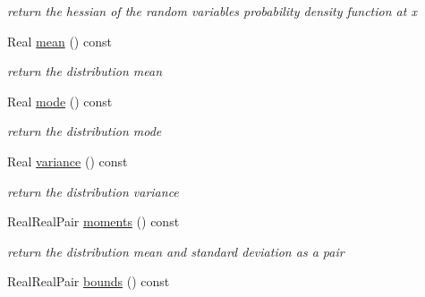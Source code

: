 \begin{DoxyCompactItemize}
\begin{DoxyCompactList}\small\item\em return the hessian of the random variable\textquotesingle{}s probability density function at x \end{DoxyCompactList}\item 
Real \hyperlink{classPecos_1_1HistogramBinRandomVariable_a962ffe5a3593be370d5c883365c060f4}{mean} () const \label{classPecos_1_1HistogramBinRandomVariable_a962ffe5a3593be370d5c883365c060f4}

\begin{DoxyCompactList}\small\item\em return the distribution mean \end{DoxyCompactList}\item 
Real \hyperlink{classPecos_1_1HistogramBinRandomVariable_a72d3d6926edd929cb3f8e12baa655f70}{mode} () const \label{classPecos_1_1HistogramBinRandomVariable_a72d3d6926edd929cb3f8e12baa655f70}

\begin{DoxyCompactList}\small\item\em return the distribution mode \end{DoxyCompactList}\item 
Real \hyperlink{classPecos_1_1HistogramBinRandomVariable_a4b8b05b2a9af92dad9cc304c2925a4eb}{variance} () const \label{classPecos_1_1HistogramBinRandomVariable_a4b8b05b2a9af92dad9cc304c2925a4eb}

\begin{DoxyCompactList}\small\item\em return the distribution variance \end{DoxyCompactList}\item 
Real\+Real\+Pair \hyperlink{classPecos_1_1HistogramBinRandomVariable_a80e9024c98c6105a5eace8601a91b3d3}{moments} () const 
\begin{DoxyCompactList}\small\item\em return the distribution mean and standard deviation as a pair \end{DoxyCompactList}\item 
Real\+Real\+Pair \hyperlink{classPecos_1_1HistogramBinRandomVariable_a4bdb95a8fa5fffaa0de5102f56963cf2}{bounds} () const \label{classPecos_1_1HistogramBinRandomVariable_a4bdb95a8fa5fffaa0de5102f56963cf2}


\end{DoxyCompactItemize}
